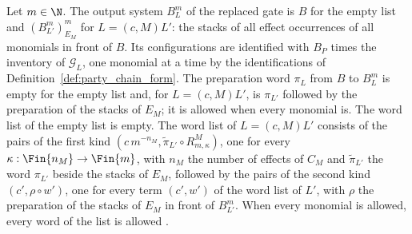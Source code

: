 \begin{definition}
    \label{def:party_replaced_gate_output}
    \leanok
    Let $m\in\N$. The output system $B^m_L$ of the replaced gate is $B$ for the empty
    list and $(B^m_{L'})^m_{E_M}$ for $L=(c,M)L'$: the stacks of all effect
    occurrences of all monomials in front of $B$. Its configurations are identified
    with $B_P$ times the inventory of $\mathcal G_L$, one monomial at a time by the
    identifications of Definition~\ref{def:party_chain_form}. The preparation word
    $\pi_L$ from $B$ to $B^m_L$ is empty for the empty list and, for $L=(c,M)L'$, is
    $\pi_{L'}$ followed by the preparation of the stacks of $E_M$; it is allowed when
    every monomial is. The word list of the empty list is empty. The word list of
    $L=(c,M)L'$ consists of the pairs of the first kind
    $(c\,m^{-n_M},\tilde\pi_{L'}\circ R^M_{m,\kappa})$, one for every
    $\kappa:\Fin{n_M}\to\Fin{m}$, with $n_M$ the number of effects of $C_M$ and
    $\tilde\pi_{L'}$ the word $\pi_{L'}$ beside the stacks of $E_M$, followed by the
    pairs of the second kind $(c',\rho\circ w')$, one for every term $(c',w')$ of the
    word list of $L'$, with $\rho$ the preparation of the stacks of $E_M$ in front of
    $B^m_{L'}$. When every monomial is allowed, every word of the list is allowed
    \cite[Lemma~5.1]{OpenAI2026PolynomialPEPS}.
\end{definition}

